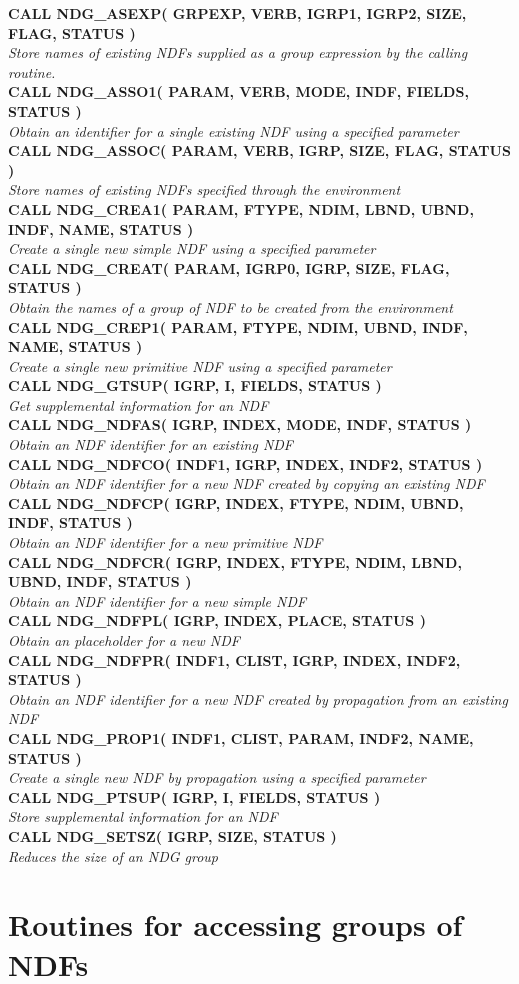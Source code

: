 \documentclass[twoside,11pt,nolof]{starlink}
\providecommand{\noteroutine}[2]{{\small \bf #1} \\
                              \hspace*{3em} \emph{#2} \\[1.5ex]}
\begin{document}
\noteroutine{
      CALL NDG\_ASEXP( GRPEXP, VERB, IGRP1, IGRP2, SIZE, FLAG, STATUS )
}{
   Store names of existing NDFs supplied as a group expression by the
   calling routine.
}
\noteroutine{
      CALL NDG\_ASSO1( PARAM, VERB, MODE, INDF, FIELDS, STATUS )
}{
   Obtain an identifier for a single existing NDF using a specified
   parameter
}
\noteroutine{
      CALL NDG\_ASSOC( PARAM, VERB, IGRP, SIZE, FLAG, STATUS )
}{
   Store names of existing NDFs specified through the environment
}
\noteroutine{
      CALL NDG\_CREA1( PARAM, FTYPE, NDIM, LBND, UBND, INDF, NAME,
                      STATUS )
}{
   Create a single new simple NDF using a specified parameter
}
\noteroutine{
      CALL NDG\_CREAT( PARAM, IGRP0, IGRP, SIZE, FLAG, STATUS )
}{
   Obtain the names of a group of NDF to be created from the
   environment
}
\noteroutine{
      CALL NDG\_CREP1( PARAM, FTYPE, NDIM, UBND, INDF, NAME, STATUS )
}{
   Create a single new primitive NDF using a specified parameter
}
\noteroutine{
      CALL NDG\_GTSUP( IGRP, I, FIELDS, STATUS )
}{
   Get supplemental information for an NDF
}
\noteroutine{
      CALL NDG\_NDFAS( IGRP, INDEX, MODE, INDF, STATUS )
}{
   Obtain an NDF identifier for an existing NDF
}
\noteroutine{
      CALL NDG\_NDFCO( INDF1, IGRP, INDEX, INDF2, STATUS )
}{
   Obtain an NDF identifier for a new NDF created by copying an
   existing NDF
}
\noteroutine{
      CALL NDG\_NDFCP( IGRP, INDEX, FTYPE, NDIM, UBND, INDF, STATUS )
}{
   Obtain an NDF identifier for a new primitive NDF
}
\noteroutine{
      CALL NDG\_NDFCR( IGRP, INDEX, FTYPE, NDIM, LBND, UBND, INDF,
                      STATUS )
}{
   Obtain an NDF identifier for a new simple NDF
}
\noteroutine{
      CALL NDG\_NDFPL( IGRP, INDEX, PLACE, STATUS )
}{
   Obtain an placeholder for a new NDF
}
\noteroutine{
      CALL NDG\_NDFPR( INDF1, CLIST, IGRP, INDEX, INDF2, STATUS )
}{
   Obtain an NDF identifier for a new NDF created by propagation from
   an existing NDF
}
\noteroutine{
      CALL NDG\_PROP1( INDF1, CLIST, PARAM, INDF2, NAME, STATUS )
}{
   Create a single new NDF by propagation using a specified parameter
}
\noteroutine{
      CALL NDG\_PTSUP( IGRP, I, FIELDS, STATUS )
}{
   Store supplemental information for an NDF
}
\noteroutine{
      CALL NDG\_SETSZ( IGRP, SIZE, STATUS )
}{
   Reduces the size of an NDG group
}

\section{Routines for accessing groups of NDFs}
\label {SEC:FULLSPEC}
\end{document}

